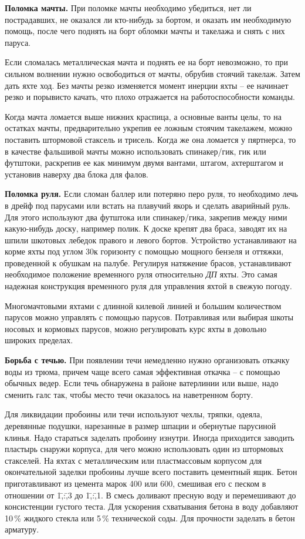 \textbf{Поломка мачты.} При поломке мачты необходимо убедиться, нет ли пострадавших, не оказался ли кто-нибудь за бортом, и оказать им необходимую помощь, после чего поднять на борт обломки мачты и такелажа и снять с них паруса.

Если сломалась металлическая мачта и поднять ее на борт невозможно, то при сильном волнении нужно освободиться от мачты, обрубив стоячий такелаж. Затем дать яхте ход. Без мачты резко изменяется момент инерции яхты \--- ее начинает резко и порывисто качать, что плохо отражается на работоспособности команды.

Когда мачта ломается выше нижних краспица, а основные ванты целы, то на остатках мачты, предварительно укрепив ее ложным стоячим такелажем, можно поставить штормовой стаксель и трисель. Когда же она ломается у пяртнерса, то в качестве фальшивой мачты можно использовать спинакер\-/гик, гик или футштоки, раскрепив ее как минимум двумя вантами, штагом, ахтерштагом и установив наверху два блока для фалов.

\textbf{Поломка руля.} Если сломан баллер или потеряно перо руля, то необходимо лечь в дрейф под парусами или встать на плавучий якорь и сделать аварийный руль. Для этого используют два футштока или спинакер\-/гика, закрепив между ними какую-нибудь доску, например полик. К доске крепят два браса, заводят их на шпили шкотовых лебедок правого и левого бортов. Устройство устанавливают на корме яхты под углом 30\gr к горизонту с помощью мощного бензеля и оттяжки, проведенной к обушкам на палубе. Регулируя натяжение брасов, устанавливают необходимое положение временного руля относительно \textit{ДП} яхты. Это самая надежная конструкция временного руля для управления яхтой в свежую погоду.

Многомачтовыми яхтами с длинной килевой линией и большим количеством парусов можно управлять с помощью парусов. Потравливая или выбирая шкоты носовых и кормовых парусов, можно регулировать курс яхты в довольно широких пределах. 

\textbf{Борьба с течью.} При появлении течи немедленно нужно организовать откачку воды из трюма, причем чаще всего самая эффективная откачка \--- с помощью обычных ведер. Если течь обнаружена в районе ватерлинии или выше, надо сменить галс так, чтобы место течи оказалось на наветренном борту.

Для ликвидации пробоины или течи используют чехлы, тряпки, одеяла, деревянные подушки, нарезанные в размер шпации и обернутые парусиной клинья. Надо стараться заделать пробоину изнутри. Иногда приходится заводить пластырь снаружи корпуса, для чего можно использовать один из штормовых стакселей. На яхтах с металлическим или пластмассовым корпусом для окончательной заделки пробоины лучше всего поставить цементный ящик. Бетон приготавливают из цемента марок 400 или 600, смешивая его с песком в отношении от 1\=,:\=,3 до 1\=,:\=,1. В смесь доливают пресную воду и перемешивают до консистенции густого теста. Для ускорения схватывания бетона в воду добавляют 10\,\% жидкого стекла или 5\,\% технической соды. Для прочности заделать в бетон арматуру. 

